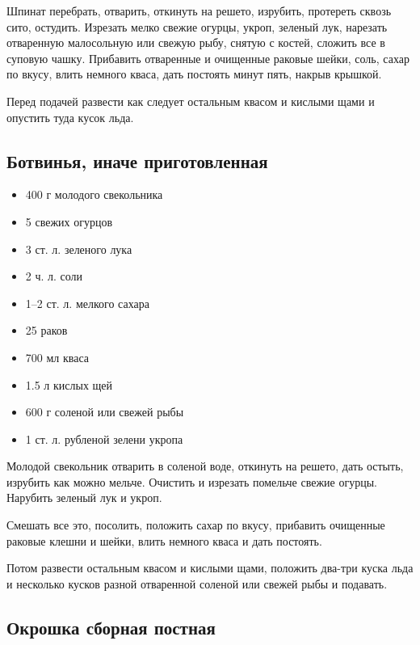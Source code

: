 Шпинат перебрать, отварить, откинуть на решето, изрубить, протереть сквозь сито, остудить. Изрезать мелко свежие огурцы, укроп, зеленый лук, нарезать отваренную малосольную или свежую рыбу, снятую с костей, сложить все в суповую чашку. Прибавить отваренные и очищенные раковые шейки, соль, сахар по вкусу, влить немного кваса, дать постоять минут пять, накрыв крышкой.

Перед подачей развести как следует остальным квасом и кислыми щами и опустить туда кусок льда.

\subsection{Ботвинья, иначе приготовленная}

\begin{itemize}
	\item 400 г молодого свекольника 
    \item 5 свежих огурцов
    \item 3 ст. л. зеленого лука 
    \item 2 ч. л. соли
    \item 1–2 ст. л. мелкого сахара 
    \item 25 раков
    \item 700 мл кваса
    \item 1.5 л кислых щей 
    \item 600 г соленой или свежей рыбы 
    \item 1 ст. л. рубленой зелени укропа
\end{itemize}

Молодой свекольник отварить в соленой воде, откинуть на решето, дать остыть, изрубить как можно мельче. Очистить и изрезать помельче свежие огурцы. Нарубить зеленый лук и укроп.

Смешать все это, посолить, положить сахар по вкусу, прибавить очищенные раковые клешни и шейки, влить немного кваса и дать постоять.

Потом развести остальным квасом и кислыми щами, положить два-три куска льда и несколько кусков разной отваренной соленой или свежей рыбы и подавать.

\subsection{Окрошка сборная постная}


